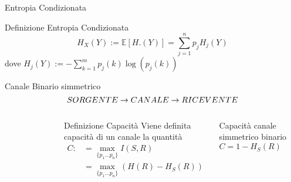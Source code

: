 \documentclass{beamer}
\theoremstyle{definition}
\numberwithin{equation}{section}
\begin{document}
\begin{frame}[t]{Entropia Condizionata} \vspace{5pt}
\begin{block}{Definizione Entropia Condizionata}
\vspace{0.5em}
\begin{equation*}
H_X(Y):= \mathbb{E}[H.(Y)]= \sum_{j=1}^n p_j H_j(Y)
\end{equation*}
dove $H_j(Y):=-\sum_{k=1}^m p_j(k)\log(p_j(k))$
\vspace{0.5em}
\end{block}
\vspace{10pt}
\vspace{20pt}
\end{frame}


\begin{frame}[t]{Canale Binario simmetrico}
\begin{equation*}
\large{SORGENTE  \to CANALE  \to RICEVENTE}
\end{equation*}

\begin{columns}[onlytextwidth]

\begin{figure}[H]
{}
\end{figure}
\vspace{20pt}

\begin{block}{Definizione Capacità}
Viene definita capacità di un canale la quantità
\[
\begin{split}
C:&=\max_{\{ p_1...p_n \}} I(S,R) \\
&=\max_{\{ p_1...p_n \}}(H(R)-H_S(R))
\end{split}
\]
\end{block}
 Capacità canale simmetrico binario  $C=1-H_S(R)$


\end{columns}


\end{frame}
\end{document}
